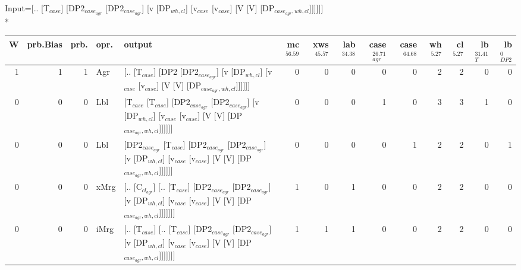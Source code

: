 \begingroup\scriptsize Input=[.. [T$_{case}$] [DP2$_{case_{agr}}$ [DP2$_{case_{agr}}$] [v [DP$_{wh,cl}$] [v$_{case}$ [v$_{case}$] [V [V] [DP$_{case_{agr},wh,cl}$]]]]]]\\*
\begin{tabularx}{\linewidth}{rrrlXrrrrrrrrr}
\hline
   W &   prb.Bias &   prb. & opr.   & output                                                                                                                                                                                                   &   mc$^{56.59}$ &   xws$^{45.57}$ &   lab$^{34.38}$ &   case$_{agr}^{26.71}$ &   case$^{64.68}$ &   wh$^{5.27}$ &   cl$^{5.27}$ &   lb$_{T}^{31.41}$ &   lb$_{DP2}^{0}$ \\
\hline
   1 &       1 &   1 & Agr  & [.. [T$_{case}$] [DP2 [DP2$_{case_{agr}}$] [v [DP$_{wh,cl}$] [v$_{case}$ [v$_{case}$] [V [V] [DP$_{case_{agr},wh,cl}$]]]]]]                                                                                                          &            0 &             0 &             0 &                  0 &              0 &           2 &           2 &              0 &            0 \\
   0 &       0 &   0 & Lbl  & [T$_{case}$ [T$_{case}$] [DP2$_{case_{agr}}$ [DP2$_{case_{agr}}$] [v [DP$_{wh,cl}$] [v$_{case}$ [v$_{case}$] [V [V] [DP$_{case_{agr},wh,cl}$]]]]]]                                                                                             &            0 &             0 &             0 &                  1 &              0 &           3 &           3 &              1 &            0 \\
   0 &       0 &   0 & Lbl  & [DP2$_{case_{agr}}$ [T$_{case}$] [DP2$_{case_{agr}}$ [DP2$_{case_{agr}}$] [v [DP$_{wh,cl}$] [v$_{case}$ [v$_{case}$] [V [V] [DP$_{case_{agr},wh,cl}$]]]]]]                                                                                       &            0 &             0 &             0 &                  0 &              1 &           2 &           2 &              0 &            1 \\
   0 &       0 &   0 & xMrg & [.. [C$_{cl_{agr}}$] [.. [T$_{case}$] [DP2$_{case_{agr}}$ [DP2$_{case_{agr}}$] [v [DP$_{wh,cl}$] [v$_{case}$ [v$_{case}$] [V [V] [DP$_{case_{agr},wh,cl}$]]]]]]]                                                                                 &            1 &             0 &             1 &                  0 &              0 &           2 &           2 &              0 &            0 \\
   0 &       0 &   0 & iMrg & [.. [T$_{case}$] [.. [T$_{case}$] [DP2$_{case_{agr}}$ [DP2$_{case_{agr}}$] [v [DP$_{wh,cl}$] [v$_{case}$ [v$_{case}$] [V [V] [DP$_{case_{agr},wh,cl}$]]]]]]]                                                                                   &            1 &             1 &             1 &                  0 &              0 &           2 &           2 &              0 &            0 \\

\end{tabularx}
